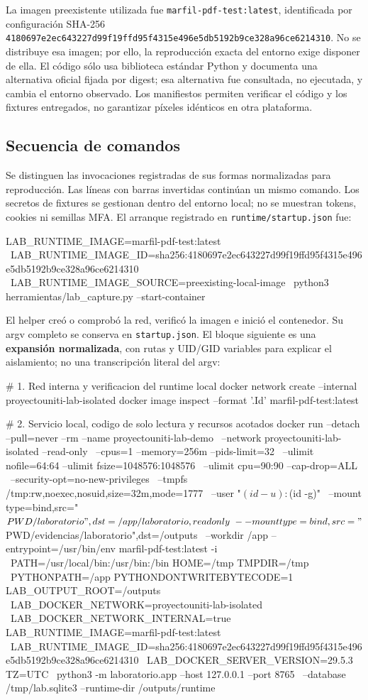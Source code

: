 \documentclass[10pt,a4paper]{article}
\newcommand{\archivo}[1]{{\ttfamily\nolinkurl{#1}}}
\begin{document}
La imagen preexistente utilizada fue \archivo{marfil-pdf-test:latest}, identificada por configuración SHA-256 \archivo{4180697e2ec643227d99f19ffd95f4315e496e5db5192b9ce328a96ce6214310}. No se distribuye esa imagen; por ello, la reproducción exacta del entorno exige disponer de ella. El código sólo usa biblioteca estándar Python y documenta una alternativa oficial fijada por digest; esa alternativa fue consultada, no ejecutada, y cambia el entorno observado. Los manifiestos permiten verificar el código y los fixtures entregados, no garantizar píxeles idénticos en otra plataforma.

\subsection*{Secuencia de comandos}
Se distinguen las invocaciones registradas de sus formas normalizadas para reproducción. Las líneas con barras invertidas continúan un mismo comando. Los secretos de fixtures se gestionan dentro del entorno local; no se muestran tokens, cookies ni semillas MFA. El arranque registrado en \archivo{runtime/startup.json} fue:
\begin{CodigoTerminal}
LAB_RUNTIME_IMAGE=marfil-pdf-test:latest \
LAB_RUNTIME_IMAGE_ID=sha256:4180697e2ec643227d99f19ffd95f4315e496e5db5192b9ce328a96ce6214310 \
LAB_RUNTIME_IMAGE_SOURCE=preexisting-local-image \
python3 herramientas/lab_capture.py --start-container
\end{CodigoTerminal}
El helper creó o comprobó la red, verificó la imagen e inició el contenedor. Su argv completo se conserva en \archivo{startup.json}. El bloque siguiente es una \textbf{expansión normalizada}, con rutas y UID/GID variables para explicar el aislamiento; no una transcripción literal del argv:
\begin{CodigoTerminal}
# 1. Red interna y verificacion del runtime local
docker network create --internal proyectouniti-lab-isolated
docker image inspect --format '{{.Id}}' marfil-pdf-test:latest

# 2. Servicio local, codigo de solo lectura y recursos acotados
docker run --detach --pull=never --rm --name proyectouniti-lab-demo \
  --network proyectouniti-lab-isolated --read-only \
  --cpus=1 --memory=256m --pids-limit=32 \
  --ulimit nofile=64:64 --ulimit fsize=1048576:1048576 \
  --ulimit cpu=90:90 --cap-drop=ALL \
  --security-opt=no-new-privileges \
  --tmpfs /tmp:rw,noexec,nosuid,size=32m,mode=1777 \
  --user "$(id -u):$(id -g)" \
  --mount type=bind,src="$PWD/laboratorio",dst=/app/laboratorio,readonly \
  --mount type=bind,src="$PWD/evidencias/laboratorio",dst=/outputs \
  --workdir /app --entrypoint=/usr/bin/env marfil-pdf-test:latest -i \
  PATH=/usr/local/bin:/usr/bin:/bin HOME=/tmp TMPDIR=/tmp \
  PYTHONPATH=/app PYTHONDONTWRITEBYTECODE=1 LAB_OUTPUT_ROOT=/outputs \
  LAB_DOCKER_NETWORK=proyectouniti-lab-isolated \
  LAB_DOCKER_NETWORK_INTERNAL=true LAB_RUNTIME_IMAGE=marfil-pdf-test:latest \
  LAB_RUNTIME_IMAGE_ID=sha256:4180697e2ec643227d99f19ffd95f4315e496e5db5192b9ce328a96ce6214310 \
  LAB_DOCKER_SERVER_VERSION=29.5.3 TZ=UTC \
  python3 -m laboratorio.app --host 127.0.0.1 --port 8765 \
  --database /tmp/lab.sqlite3 --runtime-dir /outputs/runtime
\end{CodigoTerminal}
\end{document}
